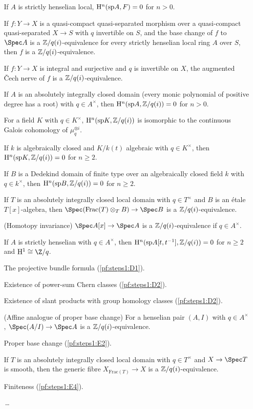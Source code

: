 \begin{definition}
\begin{description}[nosep,leftmargin=2.6em,style=sameline]
\item[B2] If $A$ is strictly henselian local, $\mathrm{H}^n(\mathrm{sp} A,F)=0$ for $n>0$.
\item[B3] If $f\colon Y\to X$ is a quasi-compact quasi-separated morphism over a quasi-compact
  quasi-separated $X\to S$ with $q$ invertible on $S$, and the base change of $f$ to $\Spec A$ is a
  $\mathbb{Z}/q(i)$-equivalence for every strictly henselian local ring $A$ over $S$, then $f$ is a
  $\mathbb{Z}/q(i)$-equivalence.
\item[B4] If $f\colon Y\to X$ is integral and surjective and $q$ is invertible on $X$, the augmented \v{C}ech
  nerve of $f$ is a $\mathbb{Z}/q(i)$-equivalence.
\item[B5] If $A$ is an absolutely integrally closed domain (every monic polynomial of positive degree has a
  root) with $q\in A^\times$, then $\mathrm{H}^n(\mathrm{sp} A,\mathbb{Z}/q(i))=0$ for $n>0$.
\item[B7] For a field $K$ with $q\in K^\times$, $\mathrm{H}^n(\mathrm{sp} K,\mathbb{Z}/q(i))$ is isomorphic to the continuous
  Galois cohomology of $\mu_q^{\otimes i}$.
\item[C1] If $k$ is algebraically closed and $K/k(t)$ algebraic with $q\in K^\times$, then
  $\mathrm{H}^n(\mathrm{sp} K,\mathbb{Z}/q(i))=0$ for $n\ge2$.
\item[C2] If $B$ is a Dedekind domain of finite type over an algebraically closed field $k$ with $q\in k^\times$,
  then $\mathrm{H}^n(\mathrm{sp} B,\mathbb{Z}/q(i))=0$ for $n\ge2$.
\item[C3] If $T$ is an absolutely integrally closed local domain with $q\in T^\times$ and $B$ is an \'etale
  $T[x]$-algebra, then $\Spec(\mathrm{Frac}(T)\otimes_TB)\to\Spec B$ is a $\mathbb{Z}/q(i)$-equivalence.
\item[C4] (Homotopy invariance) $\Spec A[x]\to\Spec A$ is a $\mathbb{Z}/q(i)$-equivalence if $q\in A^\times$.
\item[C5] If $A$ is strictly henselian with $q\in A^\times$, then $\mathrm{H}^n(\mathrm{sp} A[t,t^{-1}],\mathbb{Z}/q(i))=0$
  for $n\ge2$ and $\stepsIH^1\cong\Z/q$.
\item[D1] The projective bundle formula (\cref{pf:steps1:D1}).
\item[D2] Existence of power-sum Chern classes (\cref{pf:steps1:D2}).
\item[D3] Existence of slant products with group homology classes (\cref{pf:steps1:D2}).
\item[E1] (Affine analogue of proper base change) For a henselian pair $(A,I)$ with $q\in A^\times$,
  $\Spec(A/I)\to\Spec A$ is a $\mathbb{Z}/q(i)$-equivalence.
\item[E2] Proper base change (\cref{pf:steps1:E2}).
\item[E3] If $T$ is an absolutely integrally closed local domain with $q\in T^\times$ and $X\to\Spec T$ is
  smooth, then the generic fibre $X_{\mathrm{Frac}(T)}\to X$ is a $\mathbb{Z}/q(i)$-equivalence.
\item[E4] Finiteness (\cref{pf:steps1:E4}).
\end{description}
\,\dots\,
\end{definition}

